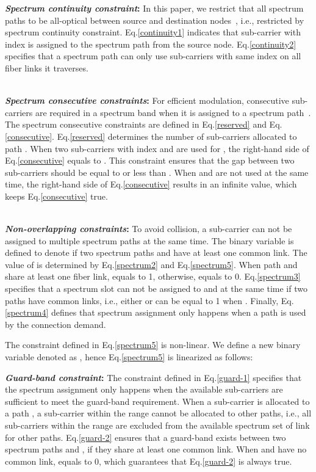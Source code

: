 \documentclass[conference]{IEEEtran}
\begin{document}
\textbf{\emph{Spectrum continuity constraint}:}  In this paper, we restrict that all spectrum paths to be all-optical 
between source and destination nodes~\cite{Wang:infocom:2011}, i.e., restricted by spectrum continuity constraint.   
Eq.\eqref{continuity1} indicates that sub-carrier with index  is assigned to the spectrum path  from the source node.  Eq.\eqref{continuity2}   specifies that  a spectrum path can only  use sub-carriers with same index on  all fiber links it traverses. 

\noindent  \\
 
\textbf{\emph{Spectrum consecutive constraints}:} For efficient modulation,   consecutive sub-carriers are required in a spectrum band when it is assigned to a spectrum path~\cite{Jinno:2009}. The spectrum consecutive constraints  are defined in Eq.\ref{reserved} and Eq.\ref{consecutive}.  Eq.\eqref{reserved} determines the number of sub-carriers allocated to path . 
When two sub-carriers with index  and   are used for , the right-hand side of  Eq.\eqref{consecutive} equals to . This constraint ensures that the gap between two sub-carriers should be equal to   or less than .  
 When  and  are not used at the same time,  the right-hand side of Eq.\eqref{consecutive} results in an infinite value, which keeps Eq.\eqref{consecutive} true.\\
\noindent  \\

\noindent 

\textbf{\emph{Non-overlapping constraints}:} To avoid collision, a  sub-carrier can not be assigned to multiple spectrum paths at the same time. The binary variable  is defined to denote if two spectrum paths  and  have at least one common link.   
    The value of    is determined by Eq.\eqref{spectrum2} and Eq.\eqref{spectrum5}. When path  and  share at least one fiber link,  equals to 1, otherwise,     equals to 0.  
  Eq.\eqref{spectrum3} specifies that a spectrum slot  can not be assigned to   and  at the same time if two paths have common links, i.e., either  or  can be equal to 1 when . Finally, Eq.\eqref{spectrum4} defines that spectrum assignment only happens when a path  is used by the connection demand.
 
The constraint defined in Eq.\eqref{spectrum5} is non-linear. We define a  new binary variable denoted as , hence Eq.\eqref{spectrum5} is linearized as follows:

\textbf{\emph{Guard-band constraint}:} 
 The constraint defined in Eq.\eqref{guard-1} specifies that the spectrum assignment only happens when the available sub-carriers are sufficient to meet the guard-band requirement.   When a sub-carrier  is allocated to a path , a sub-carrier within the range  cannot be allocated to other paths, i.e., all sub-carriers within the range   are excluded from the available spectrum set of link  for other paths.
Eq.\eqref{guard-2} ensures that a guard-band exists between  two spectrum paths  and ,  if they share at least one common link.  When  and  have no 
common link,   equals to 0, which guarantees that  Eq.\eqref{guard-2} is always true. \\
  
\end{document}
